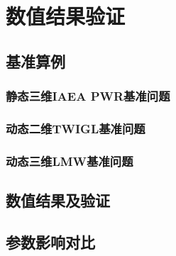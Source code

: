 

\chapter{数值结果验证}
\section{基准算例}
\subsection{静态三维IAEA PWR基准问题}
\label{sec:result.test.iaea}
\subsection{动态二维TWIGL基准问题}
\subsection{动态三维LMW基准问题}
\section{数值结果及验证}
\section{参数影响对比}
